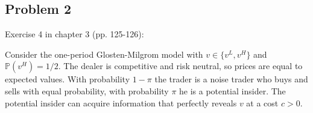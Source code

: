 \documentclass[11pt
, answers
]{exam}
\begin{document}
%
%	





\qquad
\subsection*{Problem 2}

Exercise 4 in chapter 3 (pp. 125-126):

Consider the one-period Glosten-Milgrom model with $v \in \{v^L, v^H\}$ and $\mathbb{P}(v^H)=1/2$. The dealer is competitive and risk neutral, so prices are equal to expected values. With probability $1-\pi$ the trader is a noise trader who buys and sells with equal probability, with probability $\pi$ he is a potential insider. The potential insider can acquire information that perfectly reveals $v$ at a cost $c>0$.
\end{document}
